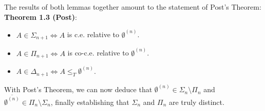 \documentclass{amsart}
\begin{document}
	The results of both lemmas together amount to the statement of Post's Theorem:\\
	
	\noindent \textbf{Theorem 1.3 (Post)}:
	\begin{itemize}
		\item $A\in \Sigma_{n+1} \iff A$ is c.e. relative to $\emptyset^{(n)}$.
		\item $A\in \Pi_{n+1} \iff A$ is co-c.e. relative to $\emptyset^{(n)}$.
		\item $A\in \Delta_{n+1}\iff A\leq_T \emptyset^{(n)}$. 
	\end{itemize}
	
	With Post's Theorem, we can now deduce that $\emptyset^{(n)}\in \Sigma_n\setminus \Pi_n$ and $\overline{\emptyset^{(n)}}\in \Pi_n\setminus \Sigma_n$, finally establishing that $\Sigma_n$ and $\Pi_n$ are truly distinct.\\
	
	
		
\end{document}
